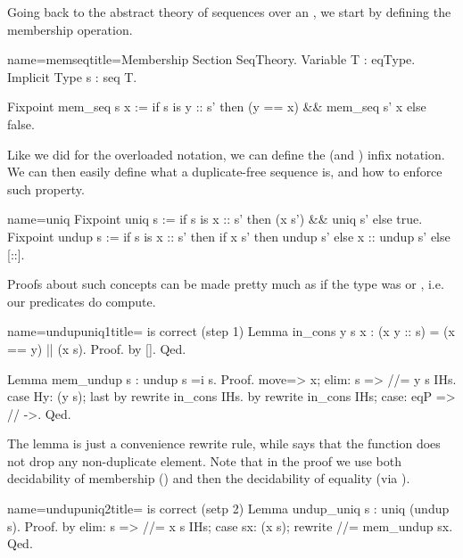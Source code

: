 Going back to the abstract theory of sequences over an ,
we start by defining the membership operation.

\begin{coq}{name=memseq}{title=Membership}
Section SeqTheory.
Variable T : eqType.
Implicit Type s : seq T.

Fixpoint mem_seq s x :=
  if s is y :: s' then (y == x) && mem_seq s' x else false.
\end{coq}

Like we did for the overloaded \C{==} notation, we can define the
\C{\\in} (and \C{\\notin}) infix notation.  We can then easily
define what a duplicate-free sequence is, and how to enforce such
property.

\begin{coq}{name=uniq}{}
Fixpoint uniq s :=
  if s is x :: s' then (x \notin s') && uniq s' else true.
Fixpoint undup s :=
  if s is x :: s' then
    if x \in s' then undup s' else x :: undup s'
  else [::].
\end{coq}

Proofs about such concepts can be made pretty much as if
the type  was  or , i.e. our predicates do
compute.

\begin{coq}{name=undupuniq1}{title= is correct (step 1)}
Lemma in_cons y s x : (x \in y :: s) = (x == y) || (x \in s).
Proof. by []. Qed.

Lemma mem_undup s : undup s =i s.
Proof.
move=> x; elim: s => //= y s IHs.
case Hy: (y \in s); last by rewrite in_cons IHs.
by rewrite in_cons IHs; case: eqP => // ->.
Qed.
\end{coq}

The  lemma is just a convenience rewrite rule, while
 says that the  function does not drop
any non-duplicate element.  Note that in the proof we use both
decidability of membership () and then the decidability of
equality (via ).

\begin{coq}{name=undupuniq2}{title= is correct (setp 2)}
Lemma undup_uniq s : uniq (undup s).
Proof.
by elim: s => //= x s IHs; case sx: (x \in s); rewrite //= mem_undup sx.
Qed.
\end{coq}

